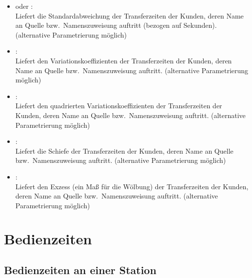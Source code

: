 \begin{itemize}
\item
{} oder :\\
Liefert die Standardabweichung der Transferzeiten der Kunden, deren Name an Quelle bzw.\ Namenszuweisung  auftritt (bezogen auf Sekunden).
(alternative Parametrierung möglich)

\item
{}:\\
Liefert den Variationskoeffizienten der Transferzeiten der Kunden, deren Name an Quelle bzw.\ Namenszuweisung  auftritt.
(alternative Parametrierung möglich)

\item
{}:\\
Liefert den quadrierten Variationskoeffizienten der Transferzeiten der Kunden, deren Name an Quelle bzw.\ Namenszuweisung  auftritt.
(alternative Parametrierung möglich)

\item
{}:\\
Liefert die Schiefe der Transferzeiten der Kunden, deren Name an Quelle bzw.\ Namenszuweisung  auftritt.
(alternative Parametrierung möglich)

\item
{}:\\
Liefert den Exzess (ein Maß für die Wölbung) der Transferzeiten der Kunden, deren Name an Quelle bzw.\ Namenszuweisung  auftritt.
(alternative Parametrierung möglich)

\end{itemize}



\section{Bedienzeiten}



\subsection{Bedienzeiten an einer Station}

